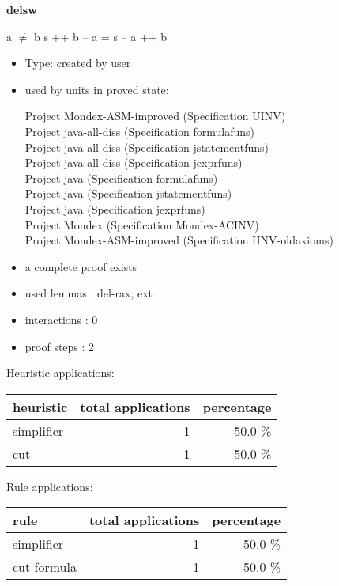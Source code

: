\documentclass[a4paper]{article}
\begin{document}
{\LARGE\bf delsw}\label{lemma-delsw}

\medskip

 \Fol a $\neq$ b \Imp s ++ b -- a = s -- a ++ b

\begin{itemize}

\item Type: created by user

\item used by units in proved state:

Project Mondex-ASM-improved (Specification UINV) \\
Project java-all-diss (Specification formulafuns) \\
Project java-all-diss (Specification jstatementfuns) \\
Project java-all-diss (Specification jexprfuns) \\
Project java (Specification formulafuns) \\
Project java (Specification jstatementfuns) \\
Project java (Specification jexprfuns) \\
Project Mondex (Specification Mondex-ACINV) \\
Project Mondex-ASM-improved (Specification IINV-oldaxioms)
\item       a complete proof exists
\item       used lemmas  : del-rax, ext
\item       interactions : 0
\item       proof steps  : 2
\end{itemize}

\medskip


Heuristic applications:

\begin{supertabular}{l|r|r}
heuristic	& total applications & percentage \\ \hline
simplifier & 1 & 50.0 \% \\
cut & 1 & 50.0 \% \\

\end{supertabular}

Rule applications:

\begin{supertabular}{l|r|r}
rule	        & total applications & percentage \\ \hline
simplifier & 1 & 50.0 \% \\
cut formula & 1 & 50.0 \% \\

\end{supertabular}
\end{document}
